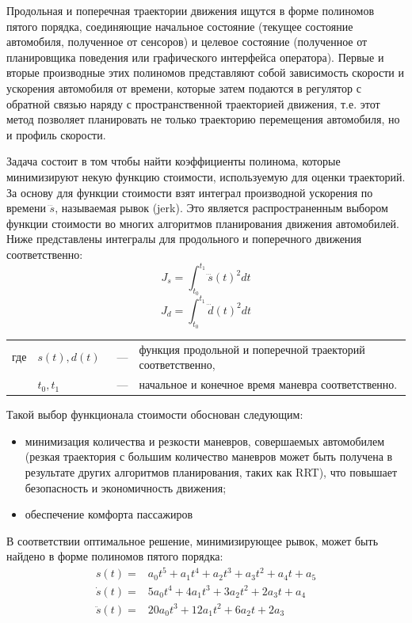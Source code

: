 Продольная и поперечная траектории движения ищутся в форме полиномов пятого порядка, соединяющие начальное состояние
(текущее состояние автомобиля, полученное от сенсоров) и целевое состояние (полученное от планировщика поведения или
графического интерфейса оператора). Первые и вторые производные этих
полиномов представляют собой зависимость скорости и ускорения автомобиля от времени, которые затем подаются в регулятор
с обратной связью наряду с пространственной траекторией движения, т.е. этот метод позволяет планировать не только
траекторию перемещения автомобиля, но и профиль скорости.

Задача состоит в том чтобы найти коэффициенты полинома, которые минимизируют некую функцию стоимости, используемую для
оценки траекторий. За основу для функции стоимости взят интеграл производной ускорения по времени $\dddot{s}$,
называемая рывок (jerk). Это является распространенным выбором функции стоимости во многих алгоритмов планирования
движения автомобилей. Ниже представлены интегралы для продольного и поперечного движения соответственно:
\begin{equation}
      \label{eq:lon_jerk_integral}
      J_s = \int_{t_0}^{t_1}{\dddot{s}(t)^2dt}
\end{equation}
\begin{equation}
      \label{eq:lat_jerk_integral}
      J_d = \int_{t_0}^{t_1}{\dddot{d}(t)^2dt}
\end{equation}

\noindent\begin{tabularx}{\linewidth}{lllX}
      где & $s(t), d(t)$ &~---& функция продольной и поперечной траекторий соответственно, \\
          & $t_0, t_1$   &~---& начальное и конечное время маневра соответственно. \\
\end{tabularx}

Такой выбор функционала стоимости обоснован следующим:
\begin{itemize}
      \item минимизация количества и резкости маневров, совершаемых автомобилем (резкая траектория
            с большим количество маневров может быть получена в результате других алгоритмов
            планирования, таких как RRT), что повышает безопасность и экономичность движения;
      \item обеспечение комфорта пассажиров
\end{itemize}

В соответствии \cite{darpa_junior_frenet_origin} оптимальное решение, минимизирующее рывок, может быть найдено в форме
полиномов пятого порядка:
\begin{eqnarray}
      \label{eq:quntic_and_d}
      s(t)        =& a_0t^5   + a_1t^4 + a_2t^3 + a_3t^2 + a_4t + a_5 \\
      \dot{s}(t)  =& 5a_0t^4  + 4a_1t^3 + 3a_2t^2 + 2a_3t + a_4 \\
      \ddot{s}(t) =& 20a_0t^3 + 12a_1t^2 + 6a_2t + 2a_3
\end{eqnarray}

